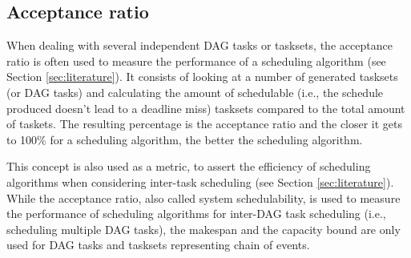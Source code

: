 %
%

\subsection{Acceptance ratio}

When dealing with several independent DAG tasks
or tasksets, 
the acceptance ratio is often used to measure the 
performance of a scheduling algorithm (see Section \ref{sec:literature}).
It consists of looking at a number of generated tasksets (or DAG tasks)
and calculating the amount of schedulable (i.e., 
the schedule produced doesn't lead to a deadline miss) tasksets compared to 
the total amount of taskets.
The resulting percentage is the acceptance ratio 
and the closer it gets to 100\% for a scheduling algorithm, the better the scheduling algorithm.

This concept is also used as a metric, to assert the efficiency
of scheduling algorithms when considering inter-task scheduling (see Section \ref{sec:literature}).
\\


While the acceptance ratio, also called system schedulability, is used 
to measure the performance of scheduling algorithms for inter-DAG task scheduling
(i.e., scheduling multiple DAG tasks),
the makespan and the capacity bound are only used for DAG tasks and tasksets representing chain of events.

